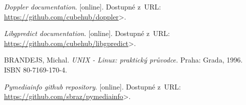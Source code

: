 \begin{literatura}{99}
    \emph{Doppler documentation}. [online].
    Dostupné z~URL:\\
    \url{https://github.com/cubehub/doppler}>.

    \emph{Libgpredict documentation}. [online].
    Dostupné z~URL:\\
    \url{https://github.com/cubehub/libgpredict}>.

    BRANDEJS, Michal.
    \emph{UNIX - Linux: praktický průvodce.} Praha: Grada, 1996. ISBN 80-7169-170-4.

    \emph{Pymediainfo github repository}. [online].
    Dostupné z~URL:\\
    \url{https://github.com/sbraz/pymediainfo}>.



%
%
%
%
%
%
%

\end{literatura}


